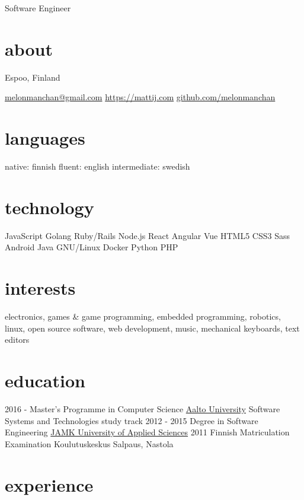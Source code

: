 \documentclass[]{friggeri-cv}
\begin{document}
       {Software Engineer}

\begin{aside}
  \section{about}
    Espoo,
    Finland
    
    \href{mailto:melonmanchan@gmail.com}{melonmanchan@gmail.com}
    \href{https://mattij.com/}{https://mattij.com}
    \href{github.com/melonmanchan}{github.com/melonmanchan}
  \section{languages}
    native: finnish
    fluent: english
    intermediate: swedish
  \section{technology}
    JavaScript
    Golang
    Ruby/Rails
    Node.js
    React
    Angular
    Vue
    HTML5
    CSS3
    Sass
    Android
    Java
    GNU/Linux
    Docker
    Python
    PHP
\end{aside}

\section{interests}

electronics, games \& game programming, embedded programming, robotics, linux, open source software, web development, music, mechanical keyboards, text editors

\section{education}

\begin{entrylist}
  \entry
    {2016 -}
    {Master's Programme in Computer Science}
    {\href{http://aalto.fi/en}{Aalto University}}
    {Software Systems and Technologies study track}
  \entry
    {2012 - 2015}
    {Degree in Software Engineering}
    {\href{https://jamk.fi/en}{JAMK University of Applied Sciences}}
    {}
  \entry
    {2011}
    {Finnish Matriculation Examination}
    {Koulutuskeskus Salpaus, Nastola}
    {}
\end{entrylist}

\section{experience}
\end{document}
